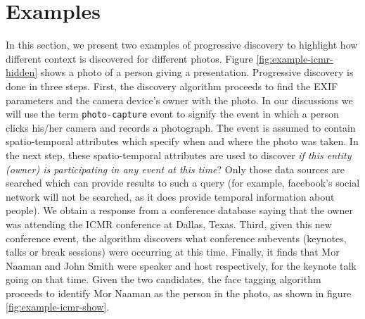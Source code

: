 \section{Examples}
In this section, we present two examples of progressive discovery to highlight how different context is discovered for different photos. Figure \ref{fig:example-icmr-hidden} shows a photo of a person giving a presentation. Progressive discovery is done in three steps. First, the discovery algorithm proceeds to find the EXIF parameters and the camera device's owner with the photo. In our discussions we will use the term \texttt{photo-capture} event to signify the event in which a person clicks his/her camera and records a photograph. The event is assumed to contain spatio-temporal attributes which specify when and where the photo was taken. In the next step, these spatio-temporal attributes are used to discover \textit{if this entity (owner) is participating in any event at this time}? Only those data sources are searched which can provide results to such a query (for example, facebook's social network will not be searched, as it does provide temporal information about people). We obtain a response from a conference database saying that the owner was attending the ICMR conference at Dallas, Texas. Third, given this new conference event, the algorithm discovers what conference subevents (keynotes, talks or break sessions) were occurring at this time. Finally, it finds that Mor Naaman and John Smith were speaker and host respectively, for the keynote talk going on that time. Given the two candidates, the face tagging algorithm proceeds to identify Mor Naaman as the person in the photo, as shown in figure \ref{fig:example-icmr-show}.

